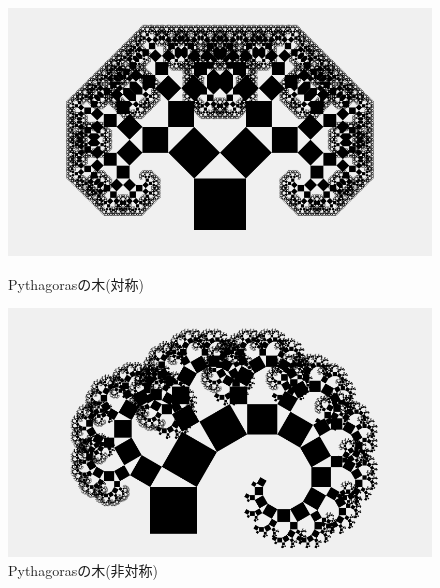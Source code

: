 \documentclass[dvipdfmx]{jsarticle}
\theoremstyle{definition}
\begin{document}
\begin{figure}[ht]
\begin{minipage}{0.5\hsize}
    \begin{center}
        \includegraphics[scale=0.22]{figure/pythagoras_tree.png}
    \end{center}
    \caption{Pythagorasの木(対称)}
\end{minipage}
\begin{minipage}{0.49\hsize}
    \begin{center}
        \includegraphics[scale=0.22]{figure/pythagoras_tree_asy.png}
    \end{center}
    \caption{Pythagorasの木(非対称)}
\end{minipage}
\end{figure}
\end{document}
